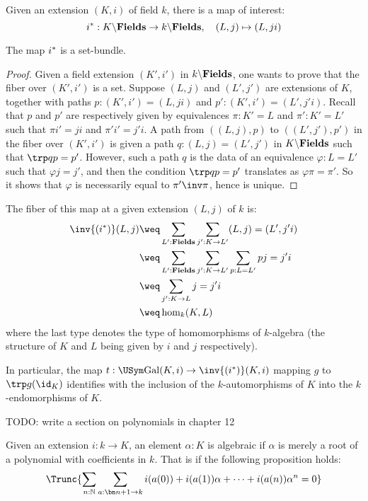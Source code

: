 Given an extension $(K,i)$ of field $k$, there is a map of interest:
\begin{displaymath}
  {{i}^\ast}: K\backslash\mathbf{Fields} \to k\backslash\mathbf{Fields},\quad (L,j) \mapsto (L,ji)
\end{displaymath}

\begin{lemma}
  The map ${{i}^\ast}$ is a set-bundle.
  \label{lem:field-ext-restriction-set-bundle}
\end{lemma}
\begin{proof}
  Given a field extension $(K',i')$ in $k\backslash\mathbf{Fields}$, one wants to prove that
  the fiber over $(K',i')$ is a set. Suppose $(L,j)$ and $(L',j')$ are
  extensions of $K$, together with paths $p:(K',i') = (L,ji)$ and $p': (K',i')
  = (L',j'i)$. Recall that $p$ and $p'$ are respectively given by equivalences
  $\pi: K' = L$ and $\pi': K' = L'$ such that $\pi i' = ji$ and $\pi' i' =
  j'i$. 
  A path from $( (L,j), p)$ to $( (L',j'), p')$ in the fiber over $(K',i')$ is
  given a path $q: (L,j) = (L',j')$ in $K\backslash\mathbf{Fields}$ such that $\trp q p =
  p'$. However, such a path $q$ is the data of an equivalence $\varphi : L =
  L'$ such that $\varphi j = j'$, and then the condition $\trp q p = p'$
  translates as $\varphi \pi = \pi'$. So it shows that $\varphi$ is necessarily
  equal to $\pi'\inv\pi$, hence is unique.  
\end{proof}

The fiber of this map at a given extension $(L,j)$ of $k$ is:
\begin{align*}
  \inv{(\restr i)}(L,j) &\weq \sum_{L':\fieldstype}\sum_{j':K \to L'}(L,j) = (L',j'i) \\
  &\weq \sum_{L':\fieldstype}\sum_{j':K\to L'}\sum_{p:L = L'} pj=j'i \\
  &\weq \sum_{j':K\to L} j=j'i \\
  &\weq \hom_k(K,L)
\end{align*}
where the last type denotes the type of homomorphisms of $k$-algebra (the structure of $K$ and $L$ being given by $i$ and $j$ respectively).

In particular, the map $t: \USym \Gal(K,i) \to \inv{(\restr i)}(K,i)$ mapping $g$ to
$\trp g (\id_K)$ identifies with the inclusion of the $k$-automorphisms of $K$
into the $k$-endomorphisms of $K$.

{\color{red} TODO: write a section on polynomials in chapter 12}
%
\begin{definition}
  Given an extension $i:k\to K$, an element $\alpha:K$ is algebraic if $\alpha$ is merely
  a root of a polynomial with coefficients in $k$. That is if the following
  proposition holds:
  \begin{displaymath}
    \Trunc{\sum_{n:\mathbb N}\sum_{a:\bn n + 1 \to k}i(a(0))+i(a(1))\alpha+\cdots+i(a(n))\alpha^n=0}%
  \end{displaymath}
  \label{defn:algebraic-element}
\end{definition}


